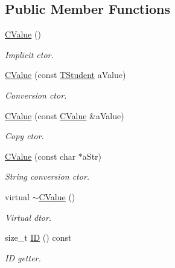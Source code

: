 \subsection*{Public Member Functions}
\begin{DoxyCompactItemize}
\item 
\hyperlink{class_c_value___t_student_1_1_c_value_ab22934b570a1682fa933b124725230bc}{C\+Value} ()
\begin{DoxyCompactList}\small\item\em Implicit c\textquotesingle{}tor. \end{DoxyCompactList}\item 
\hyperlink{class_c_value___t_student_1_1_c_value_ae7e9f4452f6d3748cc084a95948b211c}{C\+Value} (const \hyperlink{struct_c_value___t_student_1_1_t_student}{T\+Student} a\+Value)
\begin{DoxyCompactList}\small\item\em Conversion c\textquotesingle{}tor. \end{DoxyCompactList}\item 
\hyperlink{class_c_value___t_student_1_1_c_value_a093fe369a13652f089a92884b60e0cfa}{C\+Value} (const \hyperlink{class_c_value___t_student_1_1_c_value}{C\+Value} \&a\+Value)
\begin{DoxyCompactList}\small\item\em Copy c\textquotesingle{}tor. \end{DoxyCompactList}\item 
\hyperlink{class_c_value___t_student_1_1_c_value_a488e8a348d17591900a6dabe3525b797}{C\+Value} (const char $\ast$a\+Str)
\begin{DoxyCompactList}\small\item\em String conversion c\textquotesingle{}tor. \end{DoxyCompactList}\item 
virtual \hyperlink{class_c_value___t_student_1_1_c_value_a2a4f5cdb7acace3f45674d4170ca4193}{$\sim$\+C\+Value} ()
\begin{DoxyCompactList}\small\item\em Virtual d\textquotesingle{}tor. \end{DoxyCompactList}\item 
size\+\_\+t \hyperlink{class_c_value___t_student_1_1_c_value_a1566b665478e871559c8258c95903756}{ID} () const
\begin{DoxyCompactList}\small\item\em ID getter. \end{DoxyCompactList}\item 

\end{DoxyCompactItemize}
